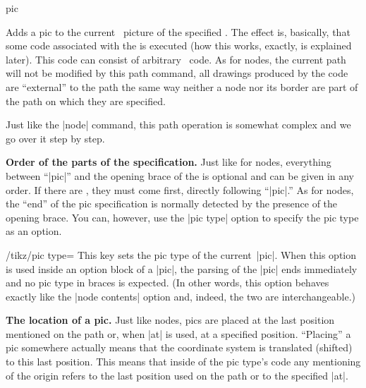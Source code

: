 \begin{pathoperation}{pic}{%
    }
  
  Adds a pic to the current \tikzname\ picture of the specified
  . The effect is, basically, that some code associated
  with the  is executed (how this works, exactly, is explained
  later). This code can consist of arbitrary \tikzname\ code. As for
  nodes, the current path will not be modified by this path command,
  all drawings produced by the code are ``external'' to the path the
  same way neither a node nor its border are part of the path on which
  they are specified. 
  
  Just like the |node| command, this path operation is somewhat
  complex and we go over it step by step.

  \medskip
  \textbf{Order of the parts of the specification.}
  Just like for nodes, everything between ``|pic|'' and the opening
  brace of the  is optional and can be given in any
  order. If there are , they must come
  first, directly following ``|pic|.'' As for nodes, the ``end'' of
  the pic specification is normally detected by the presence of the
  opening brace. You can, however, use the |pic type|
  option to specify the pic type as an option.
  
  \begin{key}{/tikz/pic type=}
    This key sets the pic type of the current~|pic|. When this option
    is used inside an option block of a |pic|, the parsing of the
    |pic| ends immediately and no pic type in braces is expected. (In
    other words, this option behaves exactly like the |node contents|
    option and, indeed, the two are interchangeable.) 
\begin{codeexample}[]
\end{codeexample}
  \end{key}

  \medskip
  \textbf{The location of a pic.}
  Just like nodes, pics are placed at the last position mentioned on
  the path or, when |at| is used, at a specified position. ``Placing''
  a pic somewhere actually means that the coordinate system is
  translated (shifted) to this last position. This means that inside
  of the pic type's code any mentioning of the origin refers to the
  last position used on the path or to the specified |at|.


\end{pathoperation}
